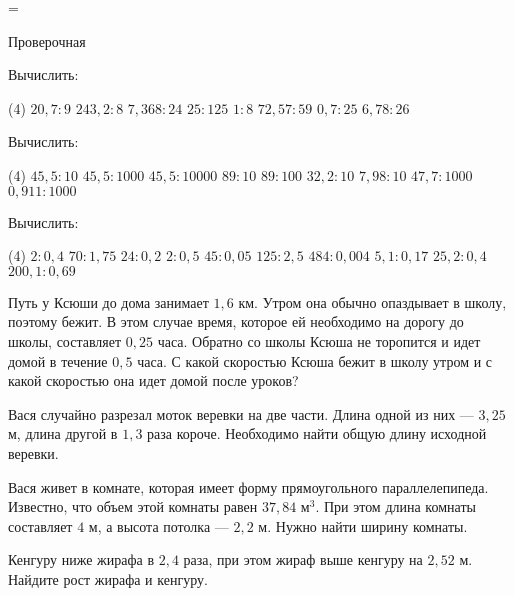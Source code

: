 =%
\begin{exam}
	\begin{listofex}
		\item Проверочная
	\end{listofex}
\end{exam}

\begin{consultation}
	\begin{listofex}
		\item Вычислить:
		\begin{tasks}(4)
			\task \( 20,7:9 \)
			\task \( 243,2:8 \)
			\task \( 7,368:24 \)
			\task \( 25:125 \)
			\task \( 1:8 \)
			\task \( 72,57:59 \)
			\task \( 0,7:25 \)
			\task \( 6,78:26 \)
		\end{tasks}
		\item Вычислить:
		\begin{tasks}(4)
			\task \( 45,5:10 \)
			\task \( 45,5:1000 \)
			\task \( 45,5:10000 \)
			\task \( 89:10 \)
			\task \( 89:100 \)
			\task \( 32,2:10 \)
			\task \( 7,98:10 \)
			\task \( 47,7:1000 \)
			\task \( 0,911:1000 \)
		\end{tasks}
		\item Вычислить:
		\begin{tasks}(4)
			\task \( 2:0,4 \)
			\task \( 70:1,75 \)
			\task \( 24:0,2 \)
			\task \( 2:0,5 \)
			\task \( 45:0,05 \)
			\task \( 125:2,5 \)
			\task \( 484:0,004 \)
			\task \( 5,1:0,17 \)
			\task \( 25,2:0,4 \)
			\task \( 200,1:0,69 \)
		\end{tasks}
		\item Путь у Ксюши до дома занимает \( 1,6 \) км. Утром она обычно опаздывает в школу, поэтому бежит. В этом случае время, которое ей необходимо на дорогу до школы, составляет \( 0,25 \) часа. Обратно со школы Ксюша не торопится и идет домой в течение \( 0,5 \) часа. С какой скоростью Ксюша бежит в школу утром и с какой скоростью она идет домой после уроков?
		\item Вася случайно разрезал моток веревки на две части. Длина одной из них --- \( 3,25 \) м, длина другой в \( 1,3 \) раза короче. Необходимо найти общую длину исходной веревки.
		\item Вася живет в комнате, которая имеет форму прямоугольного параллелепипеда. Известно, что объем этой комнаты равен \( 37,84 \) м\( ^3 \). При этом длина комнаты составляет \( 4 \) м, а высота потолка --- \( 2,2 \) м. Нужно найти ширину комнаты. 
		\item Кенгуру ниже жирафа в \( 2,4 \) раза, при этом жираф выше кенгуру на \( 2,52 \) м. Найдите рост жирафа и кенгуру.
	\end{listofex}
\end{consultation}
